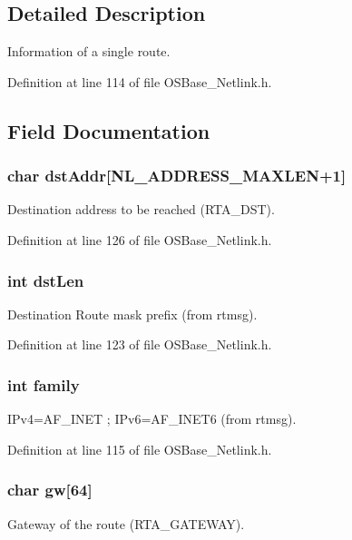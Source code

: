 \subsection{Detailed Description}
Information of a single route. 

Definition at line 114 of file OSBase\_\-Netlink.h.

\subsection{Field Documentation}
\hypertarget{structnl_route_info_a54b3e65a2c39c535e124ed189e508691}{
\subsubsection[{dstAddr}]{\setlength{\rightskip}{0pt plus 5cm}char {\bf dstAddr}\mbox{[}NL\_\-ADDRESS\_\-MAXLEN+1\mbox{]}}}
\label{structnl_route_info_a54b3e65a2c39c535e124ed189e508691}
Destination address to be reached (RTA\_\-DST). 

Definition at line 126 of file OSBase\_\-Netlink.h.\hypertarget{structnl_route_info_a1a152a3788b0ba020365726705f93ce9}{
\subsubsection[{dstLen}]{\setlength{\rightskip}{0pt plus 5cm}int {\bf dstLen}}}
\label{structnl_route_info_a1a152a3788b0ba020365726705f93ce9}
Destination Route mask prefix (from rtmsg). 

Definition at line 123 of file OSBase\_\-Netlink.h.\hypertarget{structnl_route_info_a4417150d9f858949bd9ea8794995ebcc}{
\subsubsection[{family}]{\setlength{\rightskip}{0pt plus 5cm}int {\bf family}}}
\label{structnl_route_info_a4417150d9f858949bd9ea8794995ebcc}
IPv4=AF\_\-INET ; IPv6=AF\_\-INET6 (from rtmsg). 

Definition at line 115 of file OSBase\_\-Netlink.h.\hypertarget{structnl_route_info_a8f7553e71654921434772b3c49332e9a}{
\subsubsection[{gw}]{\setlength{\rightskip}{0pt plus 5cm}char {\bf gw}\mbox{[}64\mbox{]}}}
\label{structnl_route_info_a8f7553e71654921434772b3c49332e9a}
Gateway of the route (RTA\_\-GATEWAY). 

